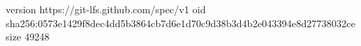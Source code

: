version https://git-lfs.github.com/spec/v1
oid sha256:0573e1429f8dec4dd5b3864cb7d6e1d70c9d38b3d4b2e043394e8d27738032ce
size 49248
